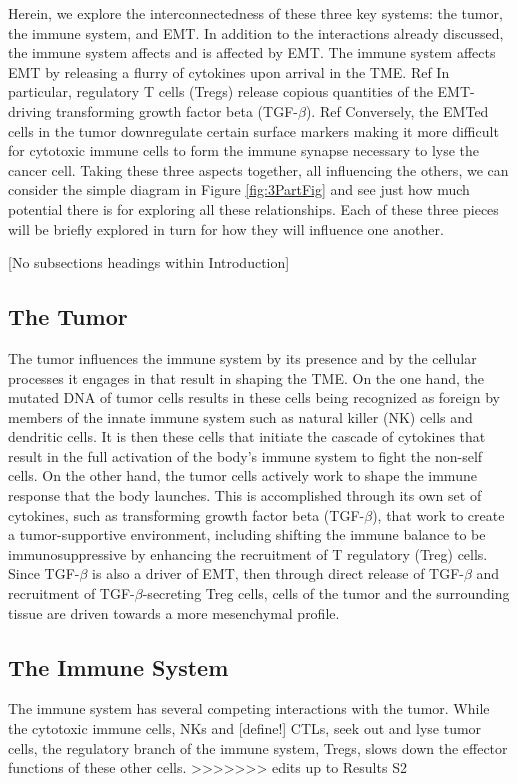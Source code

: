 \documentclass{article}
\begin{document}
Herein, we explore the interconnectedness of these three key systems: the tumor, the immune system, and EMT.
In addition to the interactions already discussed, the immune system affects and is affected by EMT.
The immune system affects EMT by releasing a flurry of cytokines upon arrival in the TME. Ref 
In particular, regulatory T cells (Tregs) release copious quantities of the EMT-driving transforming growth factor beta (TGF-$\beta$). Ref 
Conversely, the EMTed cells in the tumor downregulate certain surface markers making it more difficult for cytotoxic immune cells to form the immune synapse necessary to lyse the cancer cell.
Taking these three aspects together, all influencing the others, we can consider the simple diagram in Figure \ref{fig:3PartFig} and see just how much potential there is for exploring all these relationships.
Each of these three pieces will be briefly explored in turn for how they will influence one another.

[No subsections headings within Introduction]
\subsection{The Tumor}\label{TheTumor}
The tumor influences the immune system by its presence and by the cellular processes it engages in that result in shaping the TME.
On the one hand, the mutated DNA of tumor cells results in these cells being recognized as foreign by members of the innate immune system such as natural killer (NK) cells and dendritic cells.
It is then these cells that initiate the cascade of cytokines that result in the full activation of the body's immune system to fight the non-self cells.
On the other hand, the tumor cells actively work to shape the immune response that the body launches.
This is accomplished through its own set of cytokines, such as transforming growth factor beta (TGF-$\beta$), that work to create a tumor-supportive environment, including shifting the immune balance to be immunosuppressive by enhancing the recruitment of T regulatory (Treg) cells. Since TGF-$\beta$ is also a driver of EMT, then through direct release of TGF-$\beta$ and recruitment of TGF-$\beta$-secreting Treg cells, cells of the tumor and the surrounding tissue are driven towards a more mesenchymal profile. 


\subsection{The Immune System}\label{TheImmuneSystem}
The immune system has several competing interactions with the tumor.
While the cytotoxic immune cells, NKs and [define!] CTLs, seek out and lyse tumor cells, the regulatory branch of the immune system, Tregs, slows down the effector functions of these other cells.
>>>>>>> edits up to Results S2
\end{document}
